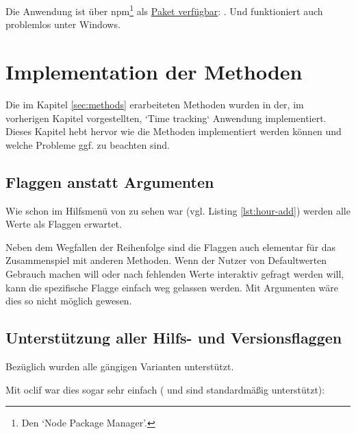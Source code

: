 \documentclass[oneside,bibliography=totocnumbered,BCOR=5mm]{scrbook}
\newenvironment{code}{\captionsetup{type=listing, skip=0pt}}{}
\begin{document}
Die Anwendung ist über npm\footnote{Den `Node Package Manager'.} als
\href{https://www.npmjs.com/package/oraclett}{Paket verfügbar}: . Und funktioniert auch problemlos unter Windows.

\chapter{Implementation der Methoden}
\label{sec:implementation}

Die im Kapitel \ref{sec:methods} erarbeiteten Methoden wurden in der, im
vorherigen Kapitel vorgestellten, `Time tracking` Anwendung implementiert.
Dieses Kapitel hebt hervor wie die Methoden implementiert werden können und
welche Probleme ggf. zu beachten sind.

\section{Flaggen anstatt Argumenten}
\label{sec:impl_flags_over_args}

Wie schon im Hilfsmenü von  zu sehen war (vgl. Listing
\ref{lst:hour-add}) werden alle Werte als Flaggen erwartet.

Neben dem Wegfallen der Reihenfolge sind die Flaggen auch elementar für das
Zusammenspiel mit anderen Methoden. Wenn der Nutzer von Defaultwerten Gebrauch
machen will oder nach fehlenden Werte interaktiv gefragt werden will, kann die
spezifische Flagge einfach weg gelassen werden. Mit Argumenten wäre dies so
nicht möglich gewesen.

\section{Unterstützung aller Hilfs- und Versionsflaggen}

Bezüglich  wurden alle gängigen Varianten
unterstützt.

Mit oclif war dies sogar sehr einfach ( und
 sind standardmäßig unterstützt):
\begin{code}
  \begin{javascriptcode}
..
"oclif": {
  "additionalHelpFlags": [
    "-h",
    "help"
  ],
  "additionalVersionFlags": [
    "-v",
    "-V",
    "-version"
    "version"
  ],
  ..
  \end{javascriptcode}
  \medskip
\end{code}
\end{document}
